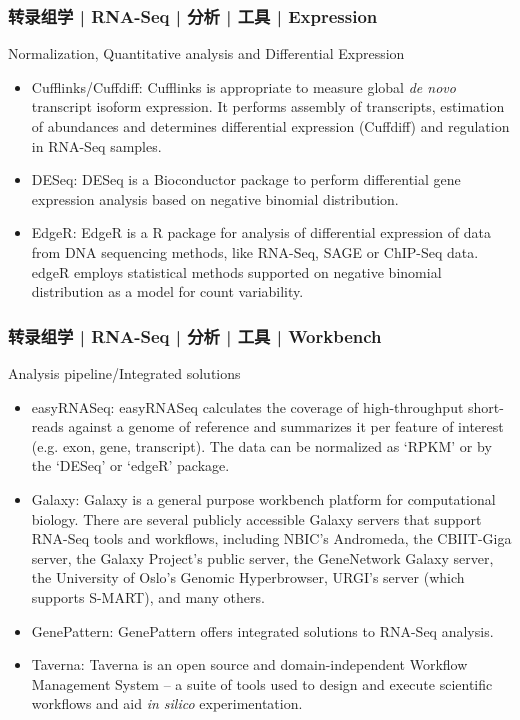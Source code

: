 \begin{frame}
  \frametitle{转录组学 | RNA-Seq | 分析 | 工具 | Expression}
  \begin{block}{Normalization, Quantitative analysis and Differential Expression}
    \begin{itemize}
      \item Cufflinks/Cuffdiff: Cufflinks is appropriate to measure global \textit{de novo} transcript isoform expression. It performs assembly of transcripts, estimation of abundances and determines differential expression (Cuffdiff) and regulation in RNA-Seq samples.
      \item DESeq: DESeq is a Bioconductor package to perform differential gene expression analysis based on negative binomial distribution.
      \item EdgeR: EdgeR is a R package for analysis of differential expression of data from DNA sequencing methods, like RNA-Seq, SAGE or ChIP-Seq data. edgeR employs statistical methods supported on negative binomial distribution as a model for count variability.
    \end{itemize}
  \end{block}
\end{frame}

\begin{frame}
  \frametitle{转录组学 | RNA-Seq | 分析 | 工具 | Workbench}
  {\footnotesize
  \begin{block}{Analysis pipeline/Integrated solutions}
    \begin{itemize}
      \item easyRNASeq: easyRNASeq calculates the coverage of high-throughput short-reads against a genome of reference and summarizes it per feature of interest (e.g. exon, gene, transcript). The data can be normalized as `RPKM' or by the `DESeq' or `edgeR' package.
      \item Galaxy: Galaxy is a general purpose workbench platform for computational biology. There are several publicly accessible Galaxy servers that support RNA-Seq tools and workflows, including NBIC's Andromeda, the CBIIT-Giga server, the Galaxy Project's public server, the GeneNetwork Galaxy server, the University of Oslo's Genomic Hyperbrowser, URGI's server (which supports S-MART), and many others.
      \item GenePattern: GenePattern offers integrated solutions to RNA-Seq analysis.
      \item Taverna: Taverna is an open source and domain-independent Workflow Management System – a suite of tools used to design and execute scientific workflows and aid \textit{in silico} experimentation.
    \end{itemize}
  \end{block}
  }
\end{frame}

